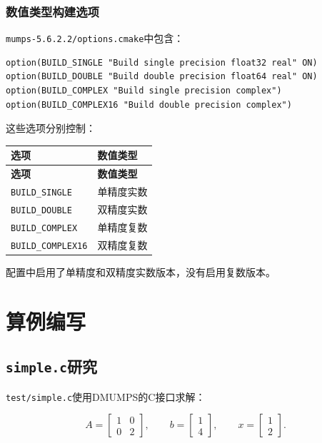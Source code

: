 \subsubsection{数值类型构建选项}

\texttt{mumps-5.6.2.2/options.cmake}中包含：

\begin{lstlisting}
option(BUILD_SINGLE "Build single precision float32 real" ON)
option(BUILD_DOUBLE "Build double precision float64 real" ON)
option(BUILD_COMPLEX "Build single precision complex")
option(BUILD_COMPLEX16 "Build double precision complex")
\end{lstlisting}

这些选项分别控制：

\begin{longtable}{p{}p{}}
\toprule
\textbf{选项} & \textbf{数值类型} \\
\midrule
\endfirsthead
\toprule
\textbf{选项} & \textbf{数值类型} \\
\midrule
\endhead
\texttt{BUILD\_SINGLE} & 单精度实数 \\
\texttt{BUILD\_DOUBLE} & 双精度实数 \\
\texttt{BUILD\_COMPLEX} & 单精度复数 \\
\texttt{BUILD\_COMPLEX16} & 双精度复数 \\
\bottomrule
\end{longtable}

配置中启用了单精度和双精度实数版本，没有启用复数版本。

\section{算例编写}

\subsection{\texttt{simple.c}研究}

\texttt{test/simple.c}使用DMUMPS的C接口求解：

\[
A=\begin{bmatrix}1&0\\0&2\end{bmatrix},\qquad
b=\begin{bmatrix}1\\4\end{bmatrix},\qquad
x=\begin{bmatrix}1\\2\end{bmatrix}.
\]


